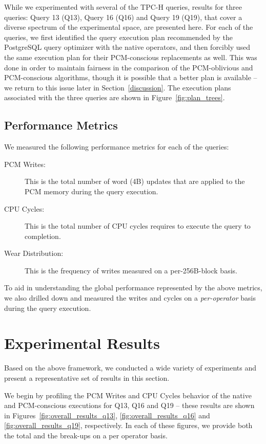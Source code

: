 While we experimented with several of the TPC-H queries, results for
three queries: Query 13 (Q13), Query 16 (Q16) and Query 19 (Q19), that
cover a diverse spectrum of the experimental space, are presented here.
For each of the queries, we first identified the query execution plan
recommended by the PostgreSQL query optimizer with the native operators,
and then forcibly used the same execution plan for their PCM-conscious
replacements as well. This was done in order to maintain fairness in the
comparison of the PCM-oblivious and PCM-conscious algorithms, though it
is possible that a better plan is available -- we return to this issue 
later in Section~\ref{discussion}. 
The execution plans associated with the three queries are shown in Figure~\ref{fig:plan_trees}. 
 







\subsection{Performance Metrics}
We measured the following performance metrics for each of the queries:
\begin{description}
\item [PCM Writes:] This is the total number of word (4B) updates that are applied to the PCM memory during
the query execution.
\item [CPU Cycles:] This is the total number of CPU cycles requires to execute the query to completion.
\item [Wear Distribution:] This is the frequency of writes measured on a per-256B-block basis.
\end{description}
To aid in understanding the global performance represented by the above metrics, we also drilled
down and measured the writes and cycles on a \emph{per-operator} basis during the query
execution.


\section{Experimental Results}
\label{sec:results}
Based on the above framework, we conducted a wide variety of experiments
and present a representative set of results in this section.

We begin by profiling the PCM Writes and CPU Cycles behavior of
the native and PCM-conscious executions for Q13, Q16 and Q19 --
these results are shown in Figures~\ref{fig:overall_results_q13},
\ref{fig:overall_results_q16} and \ref{fig:overall_results_q19},
respectively.  In each of these figures, we provide both the total and
the break-ups on a per operator basis.


